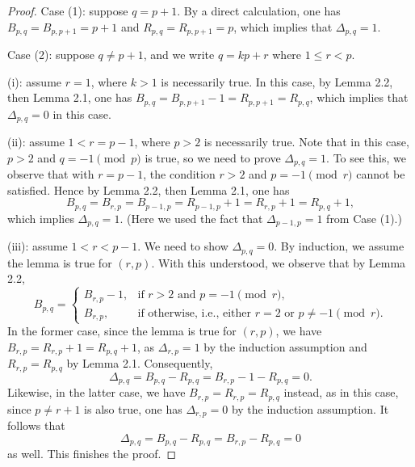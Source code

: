 \documentclass[10pt,a4paper]{amsart}
\begin{document}
\begin{proof}
Case (1): suppose $q=p+1$. By a direct calculation, one has $B_{p,q}=B_{p,p+1}=p+1$ and 
$R_{p,q}=R_{p,p+1}=p$, which implies that $\Delta_{p,q}=1$.

\vspace{2mm}

Case (2): suppose $q\neq p+1$, and we write $q=kp+r$ where $1\leq r<p$. 

\vspace{2mm}

(i): assume $r=1$, where $k>1$ is necessarily true. In this case, by Lemma 2.2, then Lemma  2.1, one has $B_{p,q}=B_{p, p+1}-1=R_{p,p+1}=R_{p,q}$, which implies that $\Delta_{p,q}=0$ in this case.

\vspace{2mm} 

(ii): assume $1<r=p-1$, where $p>2$ is necessarily true. Note that in this case, $p>2$ and $q=-1\pmod{p}$ is true, so we need to prove $\Delta_{p,q}=1$. To see this, we observe that with $r=p-1$, the condition $r>2$ and $p=-1\pmod{r}$ cannot be satisfied. Hence by Lemma 2.2, then
Lemma 2.1, one has 
$$
B_{p,q}=B_{r,p}=B_{p-1, p}=R_{p-1,p}+1=R_{r,p}+1=R_{p,q}+1,
$$ 
which implies $\Delta_{p,q}=1$. (Here we used the fact that $\Delta_{p-1,p}=1$ from Case (1).)

\vspace{2mm} 

(iii): assume $1<r<p-1$. We need to show $\Delta_{p,q}=0$. 
By induction, we assume the lemma is true for $(r,p)$. With this understood, 
we observe that by Lemma 2.2,
\[
  B_{p,q}=
  \begin{cases}
    B_{r,p}-1, & \text{if } r>2 \text{ and } p= -1\pmod r,\\
    B_{r,p}, & \text{if otherwise, i.e., either } r=2 \text{ or } p\neq -1\pmod r.
  \end{cases}
\]
In the former case, since the lemma is true for $(r,p)$, we have $B_{r,p}=R_{r,p}+1=R_{p,q}+1$,
as $\Delta_{r,p}=1$ by the induction assumption and $R_{r,p}=R_{p,q}$ by Lemma 2.1. Consequently, 
$$
\Delta_{p,q}=B_{p,q}-R_{p,q}=B_{r,p}-1-R_{p,q}=0.
$$
Likewise, in the latter case, we have $B_{r,p}=R_{r,p}=R_{p,q}$ instead, as in this case, since
$p\neq r+1$ is also true, one has $\Delta_{r,p}=0$ by the induction assumption. It follows that 
$$
\Delta_{p,q}=B_{p,q}-R_{p,q}=B_{r,p}-R_{p,q}=0
$$
as well. This finishes the proof. 
\end{proof}
\end{document}
